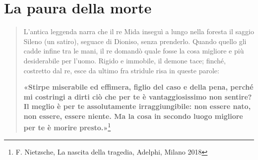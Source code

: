 \chapter{La paura della morte}

\begin{quotation}
	\small L’antica leggenda narra che il re Mida inseguì a lungo nella foresta il saggio Sileno (un satiro), seguace di Dioniso, senza prenderlo.
	Quando quello gli cadde infine tra le mani, il re domandò quale fosse la cosa migliore e più desiderabile per l’uomo.
	Rigido e immobile, il demone tace; finché, costretto dal re, esce da ultimo fra stridule risa in queste parole:
	
\textbf{	«Stirpe miserabile ed effimera, figlio del caso e della pena, perché mi costringi a dirti ciò che per te è vantaggiosissimo non sentire?
	Il meglio è per te assolutamente irraggiungibile: non essere nato, non essere, essere niente.
	Ma la cosa in secondo luogo migliore per te è morire presto.»}\footnote{ F. Nietzsche, La nascita della tragedia, Adelphi, Milano 2018}
\end{quotation}

